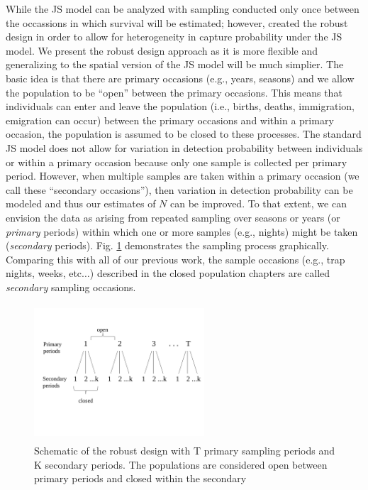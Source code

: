 While the JS model can be analyzed with sampling conducted only once between the occassions
in which survival will be estimated; however, 
\citet{pollock:1982} created the robust design in order to allow for heterogeneity in capture probability
under the JS model.  We present the robust design approach as it is more flexible and generalizing
to the spatial version of the JS model will be much simplier.
The basic idea is that there are primary occasions (e.g., years, seasons) and we
allow the population to be ``open'' between the primary occasions.  This means that individuals can enter
and leave the population (i.e., births, deaths, immigration,
emigration can occur) between the primary occasions and within a primary occasion, 
the population is assumed to be
closed to these processes.
The standard JS model 
does not allow for variation in detection probability between individuals or within
a primary occasion because only one sample is collected per primary
period.
However, when multiple samples are taken within a primary
occasion (we call these ``secondary occasions''), then variation in detection probability can be modeled and thus
our estimates of $N$ can be improved.  To
that extent, we can envision the data as arising from repeated
sampling over seasons or years (or {\it primary} periods) within which
one or more samples (e.g., nights) might be taken ({\it secondary}
periods). Fig. \ref{open.figs.robustdesign} demonstrates the sampling process graphically.
Comparing this with all of our previous work, the sample
occasions %
(e.g., trap nights, weeks, etc$\dots$) described in the closed
population chapters are 
called {\it secondary} sampling occasions. 



\begin{figure}[h]
\centering
\includegraphics[height=2in,width=2.5in]{Ch16-Open/figs/RobustDesign.pdf}
\caption{Schematic of the robust design with T primary sampling periods and K secondary periods. The populations
are considered open between primary periods and closed within the secondary}
\label{open.figs.robustdesign}
\end{figure}

